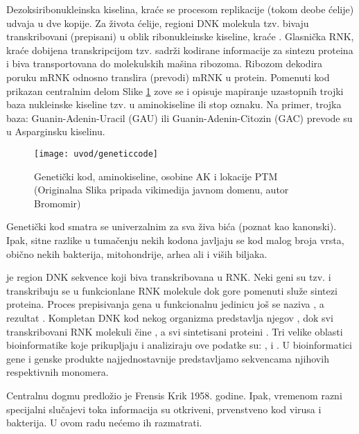 Dezoksiribonukleinska kiselina, kraće  se procesom replikacije
(tokom deobe ćelije) udvaja u dve kopije. Za života ćelije, regioni DNK
molekula tzv.  bivaju transkribovani (prepisani) u oblik
ribonukleinske kiseline, kraće . Glasnička RNK, kraće 
dobijena transkripcijom tzv.  sadrži kodirane informacije
za sintezu proteina i biva transportovana do molekulskih mašina ribozoma.
Ribozom dekodira poruku mRNK odnosno translira (prevodi) mRNK  u protein.
Pomenuti kod prikazan centralnim delom Slike \ref{fig:kod} zove se
 i opisuje mapiranje uzastopnih trojki baza nukleinske
kiseline tzv.  u aminokiseline ili stop oznaku. Na primer,
trojka baza: Guanin-Adenin-Uracil (GAU) ili Guanin-Adenin-Citozin (GAC) prevode
su u Asparginsku kiselinu.

\begin{figure}[]
\centering
\hspace*{-2.3cm} 
\texttt{[image: uvod/geneticcode]}
\caption { Genetički kod, aminokiseline, osobine AK i lokacije PTM\\
  \footnotesize
(Originalna Slika pripada vikimedija javnom domenu, autor Bromomir)}
\label{fig:kod}
\end{figure}

\clearpage

Genetički kod smatra se univerzalnim za sva živa bića (poznat kao kanonski). Ipak, sitne razlike u
tumačenju nekih kodona javljaju se kod malog broja vrsta, obično nekih
bakterija, mitohondrije, arhea ali i viših biljaka.

 je region DNK sekvence
koji biva transkribovana u RNK.  Neki geni su tzv.   i
transkribuju se u funkcionlane RNK molekule dok gore pomenuti 
služe sintezi proteina.  Proces prepisivanja gena u funkcionalnu jedinicu još
se naziva , a rezultat .
Kompletan DNK kod nekog organizma predstavlja njegov
, dok  svi transkribovani RNK molekuli čine ,
a svi sintetisani proteini .  Tri velike oblasti
bioinformatike koje prikupljaju i analiziraju ove podatke su:
,  i .
U bioinformatici gene i genske produkte najjednostavnije predstavljamo
sekvencama njihovih respektivnih monomera.


Centralnu dogmu predložio je Frensis Krik 1958. godine. Ipak, vremenom 
razni specijalni slučajevi toka informacija su otkriveni, prvenstveno kod
virusa i bakterija. U ovom radu nećemo ih razmatrati.


